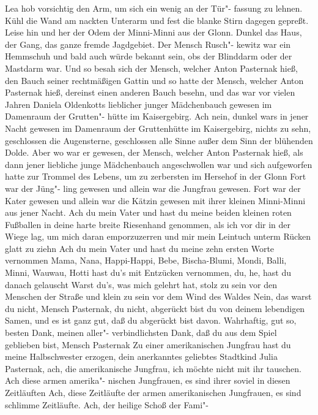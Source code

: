 Lea hob vorsichtig den Arm, um sich ein wenig an der Tür"-%
fassung zu lehnen. Kühl die Wand am nackten Unterarm
und fest die blanke Stirn dagegen gepreßt. Leise hin und her
der Odem der Minni-Minni aus der Glonn. Dunkel das Haus,
der Gang, das ganze fremde Jagdgebiet. Der Mensch Rusch"-%
kewitz war ein Hemmschuh und bald auch würde bekannt sein,
obs der Blinddarm oder der Mastdarm war. Und so besah
sich der Mensch, welcher Anton Pasternak hieß, den Bauch
seiner rechtmäßigen Gattin und so hatte der Mensch, welcher
Anton Pasternak hieß, dereinst einen anderen Bauch besehn,
und das war vor vielen Jahren Daniela Oldenkotts lieblicher
junger Mädchenbauch gewesen im Damenraum der Grutten"-%
hütte im Kaisergebirg. Ach nein, dunkel wars in jener Nacht
gewesen im Damenraum der Gruttenhütte im Kaisergebirg,
nichts zu sehn, geschlossen die Augensterne, geschlossen alle
Sinne außer dem Sinn der blühenden Dolde. Aber wo war
er gewesen, der Mensch, welcher Anton Pasternak hieß, als
dann jener liebliche junge Mädchenbauch angeschwollen war
und sich aufgeworfen hatte zur Trommel des Lebens, um
zu zerbersten im Hersehof in der Glonn\frag{} Fort war der Jüng"-%
ling gewesen und allein war die Jungfrau gewesen. Fort
war der Kater gewesen und allein war die Kätzin gewesen
mit ihrer kleinen Minni-Minni aus jener Nacht. Ach du mein
Vater und hast du meine beiden kleinen roten Fußballen
in deine harte breite Riesenhand genommen, als ich vor dir
in der Wiege lag, um mich daran emporzuzerren und mir mein
Leintuch unterm Rücken glatt zu ziehn\frag{} Ach du mein Vater
und hast du meine zehn ersten Worte vernommen\dopp{} Mama,
Nana, Happi-Happi, Bebe, Bischa-Blumi, Mondi, Balli,
Minni, Wauwau, Hotti\semi{} hast du's\eingriff{eS92-1}{du's ] Du's} mit Entzücken vernommen,
du, he, hast du danach gelauscht\frag{} Warst du's, was mich gelehrt
hat, stolz zu sein vor den Menschen der Straße und klein zu
sein vor dem Wind des Waldes\frag{} Nein, das warst du nicht,
Mensch Pasternak, du nicht, abgerückt bist du von deinem
lebendigen Samen, und es ist ganz gut, daß du abgerückt
bist davon. Wahrhaftig, gut so, besten Dank, meinen aller"-%
verbindlichsten Dank, daß du aus dem Spiel geblieben bist,
Mensch Pasternak\ausr{} Zu einer amerikanischen Jungfrau hast
du meine Halbschwester erzogen, dein anerkanntes geliebtes
Stadtkind Julia Pasternak, ach, die amerikanische Jungfrau,
ich möchte nicht mit ihr tauschen. Ach diese armen amerika"-%
nischen Jungfrauen, es sind ihrer soviel in diesen Zeitläuften\ausr{}
Ach, diese Zeitläufte der armen amerikanischen Jungfrauen,
es sind schlimme Zeitläufte. Ach, der heilige Schoß der Fami"-%
